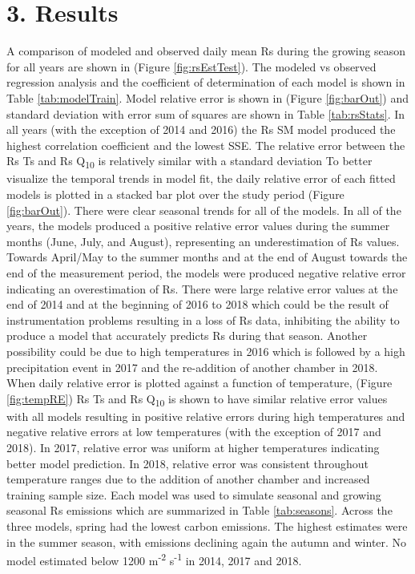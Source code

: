 \documentclass[]{elsarticle} %
\begin{document}
\hypertarget{results}{%
\section{3. Results}\label{results}}

A comparison of modeled and observed daily mean Rs during the growing
season for all years are shown in (Figure \ref{fig:rsEstTest}). The
modeled vs observed regression analysis and the coefficient of
determination of each model is shown in Table \ref {tab:modelTrain}.
Model relative error is shown in (Figure \ref{fig:barOut}) and standard
deviation with error sum of squares are shown in Table
\ref {tab:rsStats}. In all years (with the exception of 2014 and 2016)
the Rs SM model produced the highest correlation coefficient and the
lowest SSE. The relative error between the Rs Ts and Rs
Q\textsubscript{10} is relatively similar with a standard deviation
\newline \newline To better visualize the temporal trends in model fit,
the daily relative error of each fitted models is plotted in a stacked
bar plot over the study period (Figure \ref{fig:barOut}). There were
clear seasonal trends for all of the models. In all of the years, the
models produced a positive relative error values during the summer
months (June, July, and August), representing an underestimation of Rs
values. Towards April/May to the summer months and at the end of August
towards the end of the measurement period, the models were produced
negative relative error indicating an overestimation of Rs. There were
large relative error values at the end of 2014 and at the beginning of
2016 to 2018 which could be the result of instrumentation problems
resulting in a loss of Rs data, inhibiting the ability to produce a
model that accurately predicts Rs during that season. Another
possibility could be due to high temperatures in 2016 which is followed
by a high precipitation event in 2017 and the re-addition of another
chamber in 2018. \newline \newline When daily relative error is plotted
against a function of temperature, (Figure \ref{fig:tempRE}) Rs Ts and
Rs Q\textsubscript{10} is shown to have similar relative error values
with all models resulting in positive relative errors during high
temperatures and negative relative errors at low temperatures (with the
exception of 2017 and 2018). In 2017, relative error was uniform at
higher temperatures indicating better model prediction. In 2018,
relative error was consistent throughout temperature ranges due to the
addition of another chamber and increased training sample size. \newline
\newline Each model was used to simulate seasonal and growing seasonal
Rs emissions which are summarized in Table \ref {tab:seasons}. Across
the three models, spring had the lowest carbon emissions. The highest
estimates were in the summer season, with emissions declining again the
autumn and winter. No model estimated below 1200 m\textsuperscript{-2}
s\textsuperscript{-1} in 2014, 2017 and 2018.
\end{document}
